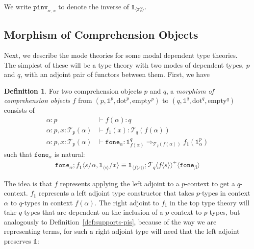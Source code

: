 \documentclass[10pt]{article}
\newtheorem{lemma}{Lemma}
\theoremstyle{definition}
\newtheorem{definition}{Definition}
\newcommand{\yields}{\vdash}
\newcommand{\tcell}{\Rightarrow}
\newcommand\TrPlus[2]{\ensuremath{{#1}^+(#2)}}
\newcommand\El[2]{\mathcal{T}_{#1}(#2)}
\newcommand\ApEl[2]{\mathcal{T}_{#1}\langle#2\rangle}
\newcommand\ap[2]{\ensuremath{#1 \langle #2 \rangle }}
\newcommand\ApPlus[2]{\ensuremath{{#1}^+ \langle #2 \rangle }}
\newcommand{\sdot}{\ensuremath{\mathrm{dot}}}
\newcommand{\sempty}{\ensuremath{\mathrm{empty}}}
\newcommand\One{\ensuremath{\mathds{1}}}
\newcommand\ApOne[1]{\ensuremath{\One_{\langle {#1} \rangle }}}
\newcommand\pinv[1]{\ensuremath{\mathtt{pinv}_{#1}}}
\newcommand\fone[1]{\ensuremath{\mathtt{fone}_{#1}}}
\begin{document}
We write $\pinv{\alpha,x}$ to denote the inverse of $\ApOne{\pi^\alpha_x}$.



\subsection{Morphism of Comprehension Objects}

Next, we describe the mode theories for some modal dependent type
theories.  The simplest of these will be a type theory with two modes of
dependent types, $p$ and $q$, with an adjoint pair of functors between
them.  First, we have

\begin{definition}\label{def:morphism-comprehension-object}
For two comprehension objects $p$ and $q$,
a \emph{morphism of comprehension objects} $f$ from $(p, \One^p, \sdot^p, \sempty^p)$ to $(q, \One^q, \sdot^q, \sempty^q)$ consists of 
\begin{align*}
\alpha : p &\yields f(\alpha) : q \\
\alpha : p, x : \El{p}{\alpha} &\yields f_1(x) : \El{q}{f(\alpha)} \\
\alpha : p, x : \El{p}{\alpha} &\yields \fone{\alpha} : \One^q_{f(\alpha)}  \tcell_{\El{q}{f(\alpha)}} f_1(\One^p_\alpha)
\end{align*}
such that $\fone{\alpha}$ is natural:
\begin{align}
\fone{\alpha};\ap{f_1}{s/\alpha, \ApOne{s}/x} \equiv \ApOne{\ap{f}{s}};\ApPlus{\ApEl{q}{\ap{f}{s}}}{\fone{\beta}}
\end{align}
\end{definition}

The idea is that $f$ represents applying the left adjoint to
a $p$-context to get a $q$-context.  $f_1$ represents a left adjoint
type constructor that takes $p$-types in context $\alpha$ to $q$-types
in context $f(\alpha)$.  The right adjoint to $f_1$ in the top
type theory will take $q$ types that are dependent on the inclusion of a
$p$ context to $p$ types, but analogously to
Definition~\ref{def:supports-pis}, because of the way we are
representing terms, for such a right adjoint type will need that the
left adjoint preserves $\One$:
\end{document}
